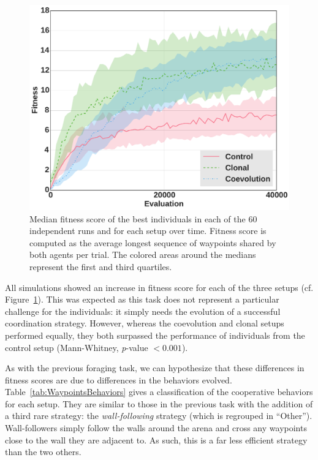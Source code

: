  \begin{figure}[hbtp]
    \begin{center}
      \includegraphics[scale = 0.3]{fig/ArticleRob1/fitnessWaypoints.pdf}
      \caption{Median fitness score of the best individuals in each of the 60 independent runs and for each setup over time. Fitness score is computed as the average longest sequence of waypoints shared by both agents per trial. The colored areas around the medians represent the first and third quartiles.}
      \label{fig:WaypointsFitness}
    \end{center}
  \end{figure}

  All simulations showed an increase in fitness score for each of the three setups (cf. Figure~\ref{fig:WaypointsFitness}). This was expected as this task does not represent a particular challenge for the individuals: it simply needs the evolution of a successful coordination strategy. However, whereas the coevolution and clonal setups performed equally, they both surpassed the performance of individuals from the control setup (Mann-Whitney, {\em p}-value $< 0.001$).

  As with the previous foraging task, we can hypothesize that these differences in fitness scores are due to differences in the behaviors evolved. Table~\ref{tab:WaypointsBehaviors} gives a classification of the cooperative behaviors for each setup. They are similar to those in the previous task with the addition of a third rare strategy: the \emph{wall-following} strategy (which is regrouped in ``Other''). Wall-followers simply follow the walls around the arena and cross any waypoints close to the wall they are adjacent to. As such, this is a far less efficient strategy than the two others. 


